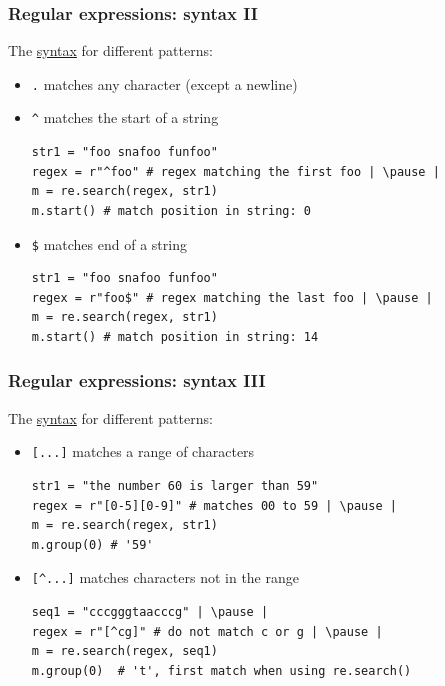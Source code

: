 \documentclass[xcolor=table]{beamer}
\begin{document}

\begin{frame}[fragile]
    \frametitle{Regular expressions: syntax II}
    
    The \href{https://docs.python.org/3.7/library/re.html#regular-expression-syntax}{syntax} for different patterns:
    \begin{itemize}
        \item\texttt{.} matches any character (except a newline) \pause
        \item\texttt{\^} matches the start of a string \pause
\begin{lstlisting}[style=python,belowskip=-1.5 \baselineskip]
str1 = "foo snafoo funfoo"
regex = r"^foo" # regex matching the first foo | \pause |  
m = re.search(regex, str1) 
m.start() # match position in string: 0
\end{lstlisting} \pause
        \item\texttt{\$} matches end of a string 
\begin{lstlisting}[style=python,belowskip=-1.5 \baselineskip]
str1 = "foo snafoo funfoo"
regex = r"foo$" # regex matching the last foo | \pause |  
m = re.search(regex, str1) 
m.start() # match position in string: 14 
\end{lstlisting} \pause
    \end{itemize}
\end{frame}
\begin{frame}[fragile]
    \frametitle{Regular expressions: syntax III}
    
    The \href{https://docs.python.org/3.7/library/re.html#regular-expression-syntax}{syntax} for different patterns:
    \begin{itemize}
    \item \texttt{[...]} matches a range of characters
\begin{lstlisting}[style=python,belowskip=-1.5 \baselineskip]
str1 = "the number 60 is larger than 59"
regex = r"[0-5][0-9]" # matches 00 to 59 | \pause |  
m = re.search(regex, str1) 
m.group(0) # '59'
\end{lstlisting} 
    \item \texttt{[\textasciicircum...]} matches characters not in the range 
\begin{lstlisting}[style=python,belowskip=-1.5 \baselineskip]
seq1 = "cccgggtaacccg" | \pause |
regex = r"[^cg]" # do not match c or g | \pause |  
m = re.search(regex, seq1) 
m.group(0)  # 't', first match when using re.search()
\end{lstlisting} 
    \end{itemize}
\end{frame}
\end{document}
